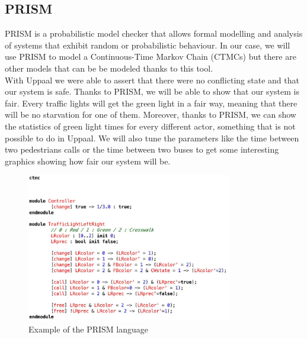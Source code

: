  \subsection{PRISM}
 PRISM is a probabilistic model checker that allows formal modelling and analysis of systems that exhibit random or probabilistic behaviour. In our case, we will use PRISM to model a Continuous-Time Markov Chain (CTMCs) but there are other models that can be be modeled thanks to this tool. \\
 With Uppaal we were able to assert that there were no conflicting state and that our system is safe. Thanks to PRISM, we will be able to show that our system is fair. Every traffic lights will get the green light in a fair way, meaning that there will be no starvation for one of them. Moreover, thanks to PRISM, we can show the statistics of green light times for every different actor, something that is not possible to do in Uppaal. We will also tune the parameters like the time between two pedestrians calls or the time between two buses to get some interesting graphics showing how fair our system will be.
 
\begin{figure}[H]\label{fig:prism}
  \begin{center}
    \includegraphics[width=0.8\textwidth]{picture/prism.png}
    \caption{Example of the PRISM language}
  \end{center}
\end{figure} 

